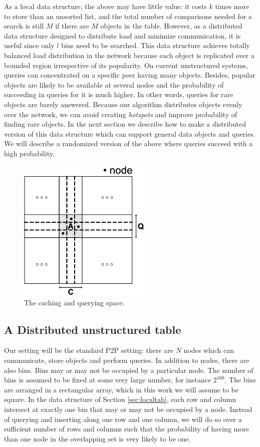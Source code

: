 \documentclass[conference]{IEEEtran}
\begin{document}
As a local data structure, the above may have little value: it costs $k$ times
more to store than an unsorted list, and the total number of comparisons
needed for a search is still $M$ if there are $M$ objects in the table.
However, as a distributed data structure designed to distribute load and
minimize communication, it is useful since only $l$ bins need to be searched.
This data structure achieves totally balanced load distribution 
in the network because each object is replicated over a bounded region 
irrespective of its popularity. On current unstructured systems, queries 
can concentrated on a specific peer having many objects. Besides, popular objects 
are likely to be available at several nodes and the probability of succeeding in
queries for it is much higher. In other words, queries for rare
objects are barely 
answered. Because our algorithm distributes objects 
evenly over the network, we can avoid creating \emph{hotspots} and improve 
probability of finding rare objects.
In the next section we describe how to
make a distributed version of this data structure which can support general
data objects and queries.  We will describe a randomized version of the above
where queries succeed with a high probability.
\begin{figure}
\centering
\includegraphics[width=2.5in]{space}
\caption{The caching and querying space.} \label{fig:space}
\end{figure}

\subsection{A Distributed unstructured table}
\label{sec:table}
Our setting will be the standard P2P setting: there are $N$ nodes which can
communicate, store objects and perform queries.  In addition to nodes, there
are also bins.  Bins may or may not be occupied by a particular node.  The
number of bins is assumed to be fixed at some very large number, for instance
$2^{160}$.  The bins are arranged in a rectangular array, which in this work
we will assume to be square.  In the data structure of
Section \ref{sec:localtab}, each row and column intersect at exactly one
bin that may or may not be occupied by a node.  Instead of
querying and inserting along one row and one column, we will do so over a
sufficient number of rows and columns such that the probability of having 
more than one node in the overlapping set is very likely to be one.
\end{document}
